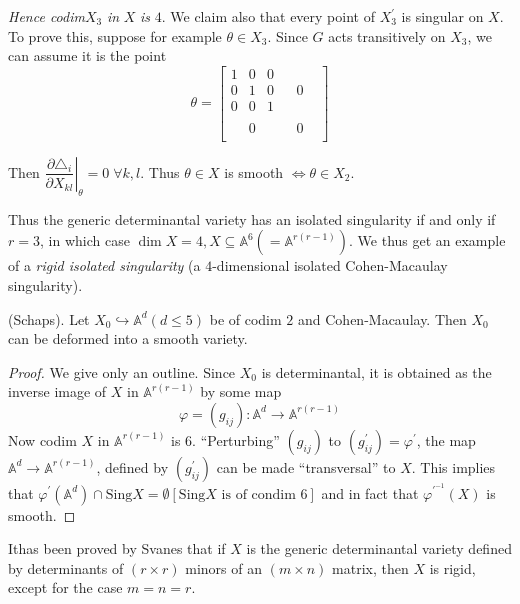 {{\em Hence codim}\pageoriginale $X_3$ {\em in} $X$ {\em is} $4$. We
claim also that every point of $X^{'}_3$ is singular on $X$. To prove
this, suppose for example $\theta\in X_3$. Since $G$ acts transitively
on $X_3$, we can assume it is the point 
$$
\theta=
\begin{bmatrix}
1 & 0 & 0 &  &  &\\
0 & 1 & 0 &  &  0 &\\
0 & 0 & 1 &  &  &\\
& & & & & \\
& 0 & & &  0 &\\
& & & & & 
\end{bmatrix}
$$

Then $\left. \dfrac{\partial \triangle_i}{\partial
X_{kl}}\right|_{\theta}=0 \; \forall k, l$. Thus $\theta\in X$ is smooth 
$\Leftrightarrow \theta \in X_2$. 

Thus the generic determinantal variety has an isolated singularity if
and only if $r=3$, in which case $\dim X=4,
X\subseteq\mathbb{A}^{6}(=\mathbb{A}^{r(r-1)})$. We thus get an
example of a {\em rigid isolated singularity} (a $4$-dimensional
isolated Cohen-Macaulay singularity).  

\begin{proposition}\label{part1-prop5.1}%
(Schaps). Let $X_0\hookrightarrow \mathbb{A}^{d} (d\le 5)$ be of codim
$2$ and Cohen-Macaulay. Then $X_0$ can be deformed into a smooth
variety. 
\end{proposition}

\begin{proof}
We give only an outline. Since $X_0$ is determinantal, it is obtained
as the inverse image of $X$ in $\mathbb{A}^{r(r-1)}$ by some map 
$$
\varphi=(g_{ij}):\mathbb{A}^{d}\to \mathbb{A}^{r(r-1)}
$$
Now codim $X$ in $\mathbb{A}^{r(r-1)}$ is $6$. ``Perturbing''
$(g_{ij})$ to $(g^{'}_{ij})=\varphi^{'}$, the map
$\mathbb{A}^{d}\to \mathbb{A}^{r(r-1)}$, defined by $(g^{'}_{ij})$ can
be made ``transversal'' to $X$. This implies that
$\varphi^{'}(\mathbb{A}^{d})\cap\text{Sing} X=\emptyset[\text{Sing}
X \text{ is of condim } 6]$ and in fact that $\varphi^{'^{-1}}(X)$ is
smooth. 
\end{proof}


\begin{remark}\label{part1-rem5.3}%
It\pageoriginale has been proved by Svanes that if $X$ is the generic
determinantal variety defined by determinants of $(r\times r)$ minors
of an $(m\times n)$ matrix, then $X$ is rigid, except for the case
$m=n=r$. 
\end{remark}

}

